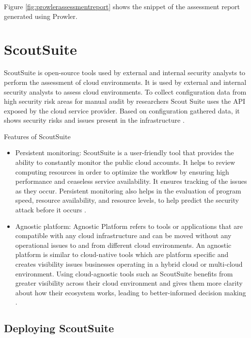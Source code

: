 Figure \ref{fig:prowlerassessmentreport} shows the snippet of the assessment report generated using Prowler.


\hfill \break
\section{ScoutSuite}

\par ScoutSuite is open-source tools used by external and
internal security analysts to perform the assessment of cloud environments.
It is used by external and internal security analysts to assess cloud environments.
To collect configuration data from high security risk areas for manual audit by researchers Scout Suite uses the API exposed by the cloud service provider.
Based on configuration gathered data, it shows security
risks and issues present in the infrastructure \cite{86}
\cite{87}.
\hfill \break
\par Features of ScoutSuite
\begin{itemize}
    \item Persistent monitoring: ScoutSuite is a user-friendly tool that provides the ability to constantly monitor
    the public cloud accounts.
    It helps to review computing resources in order to optimize the workflow by ensuring high performance and ceaseless service availability.
    It ensures tracking of the issues as they occur.
    Persistent monitoring also helps in the evaluation of
    program speed, resource availability, and resource
    levels, to help predict the security attack before it occurs \cite{88}.
\end{itemize}
\begin{itemize}
    \item Agnostic platform: Agnostic Platform refers to tools or applications that are compatible with any cloud
    infrastructure and can be moved without any operational issues to and from different cloud environments.
    An agnostic platform is similar to cloud-native tools which are platform specific and creates visibility issues businesses operating in a hybrid cloud or multi-cloud environment.
    Using cloud-agnostic tools such as ScoutSuite
    benefits from greater visibility across their cloud
    environment and gives them more clarity about how their ecosystem works, leading to better-informed decision making \cite{88}.
\end{itemize}


\hfill \break

\subsection{Deploying ScoutSuite}


